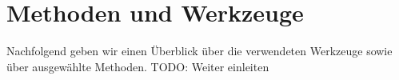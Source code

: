 \section{Methoden und Werkzeuge}
\label{sec:methods-and-tools}

Nachfolgend geben wir einen Überblick über die verwendeten Werkzeuge sowie über ausgewählte Methoden.
TODO: Weiter einleiten








